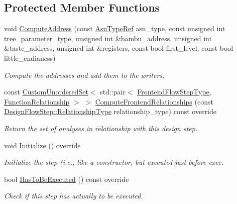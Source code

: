 \subsection*{Protected Member Functions}
\begin{DoxyCompactItemize}
\item 
void \hyperlink{classCreateAddressTranslation_ae9d301ed54d571ed497d2542988d57bc}{Compute\+Address} (const \hyperlink{asn__type_8hpp_a456d7cf50c15d087cc0428ae80834b35}{Asn\+Type\+Ref} asn\+\_\+type, const unsigned int tree\+\_\+parameter\+\_\+type, unsigned int \&bambu\+\_\+address, unsigned int \&taste\+\_\+address, unsigned int \&registers, const bool first\+\_\+level, const bool little\+\_\+endianess)
\begin{DoxyCompactList}\small\item\em Compute the addresses and add them to the writers. \end{DoxyCompactList}\item 
const \hyperlink{classCustomUnorderedSet}{Custom\+Unordered\+Set}$<$ std\+::pair$<$ \hyperlink{frontend__flow__step_8hpp_afeb3716c693d2b2e4ed3e6d04c3b63bb}{Frontend\+Flow\+Step\+Type}, \hyperlink{classFrontendFlowStep_af7cf30f2023e5b99e637dc2058289ab0}{Function\+Relationship} $>$ $>$ \hyperlink{classCreateAddressTranslation_a3cabbb27cb880dfeb1c20aec7ada4a58}{Compute\+Frontend\+Relationships} (const \hyperlink{classDesignFlowStep_a723a3baf19ff2ceb77bc13e099d0b1b7}{Design\+Flow\+Step\+::\+Relationship\+Type} relationship\+\_\+type) const override
\begin{DoxyCompactList}\small\item\em Return the set of analyses in relationship with this design step. \end{DoxyCompactList}\item 
void \hyperlink{classCreateAddressTranslation_a869c3993736729eb7be9b70c1b920255}{Initialize} () override
\begin{DoxyCompactList}\small\item\em Initialize the step (i.\+e., like a constructor, but executed just before exec. \end{DoxyCompactList}\item 
bool \hyperlink{classCreateAddressTranslation_a3570b8c94b6ff002652bffa0353cb977}{Has\+To\+Be\+Executed} () const override
\begin{DoxyCompactList}\small\item\em Check if this step has actually to be executed. \end{DoxyCompactList}\end{DoxyCompactItemize}
